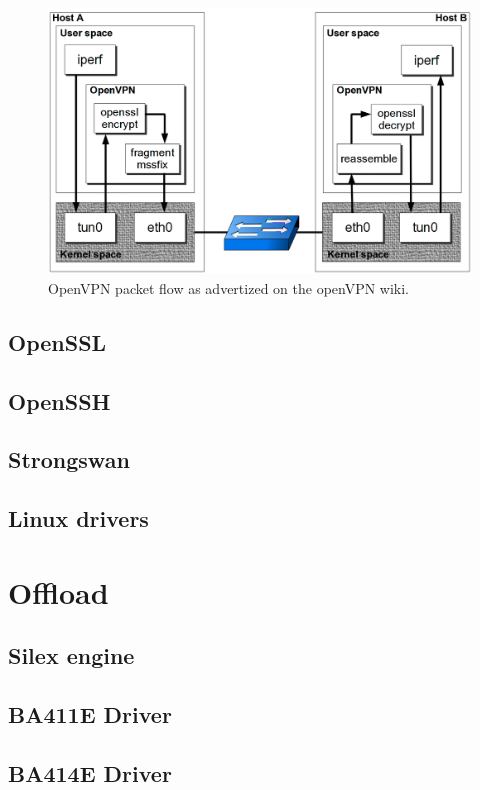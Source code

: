 \begin{figure}[ht]
\includegraphics[width=\textwidth]{OpenVPN-packetflow}
\caption{OpenVPN packet flow as advertized on the openVPN wiki.}
\label{fig:openvpn-packet-flow}
\end{figure}

\subsection{OpenSSL}


\subsection{OpenSSH}


\subsection{Strongswan}


\subsection{Linux drivers}

\section{Offload}

\subsection{Silex engine}

\subsection{BA411E Driver}

\subsection{BA414E Driver}